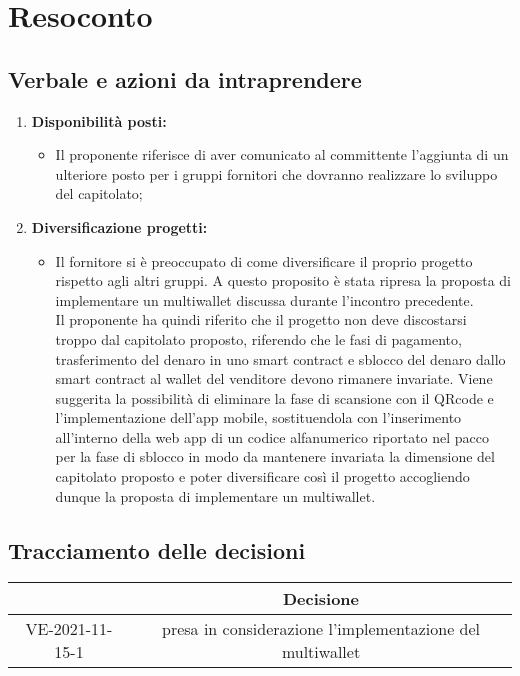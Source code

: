 \section{Resoconto}
\subsection{Verbale e azioni da intraprendere}

\begin{enumerate}
	\item \textbf{Disponibilità posti:}
	\begin{itemize}
		\item Il proponente riferisce di aver comunicato al committente l'aggiunta di un ulteriore posto per i gruppi fornitori che dovranno realizzare lo sviluppo del capitolato;
	\end{itemize}

	\item \textbf{Diversificazione progetti:}
	\begin{itemize}
		\item Il fornitore si è preoccupato di come diversificare il proprio progetto rispetto agli altri gruppi.
		A questo proposito è stata ripresa la proposta di implementare un multiwallet discussa durante l'incontro precedente.\\
		Il proponente ha quindi riferito che il progetto non deve discostarsi troppo dal capitolato proposto, riferendo che le fasi di pagamento, trasferimento del denaro in uno smart contract\glo{} e sblocco del denaro dallo smart contract\glo{} al wallet\glo{} del venditore devono rimanere invariate.
		Viene suggerita la possibilità di eliminare la fase di scansione con il QRcode e l'implementazione dell'app mobile,
		sostituendola con l'inserimento all'interno della web app\glo{} di un codice alfanumerico riportato nel pacco per la fase di sblocco
		in modo da mantenere invariata la dimensione del capitolato proposto e poter diversificare così il progetto
		accogliendo dunque la proposta di implementare un multiwallet.
	\end{itemize}

	

\end{enumerate}

\pagebreak

\subsection{Tracciamento delle decisioni}

\begin{table}[H]
	\centering
	\renewcommand{\arraystretch}{1.8}
	\begin{tabular}{c | c}
		\rowcolor[HTML]{125e28}
		\multicolumn{1}{c}{\color[HTML]{FFFFFF} \textbf{ID}} &
		\multicolumn{1}{c}{\color[HTML]{FFFFFF} \textbf{Decisione}} \\
		\hline
		VE-2021-11-15-1 & presa in considerazione l'implementazione del multiwallet\\ \hline

	\end{tabular}
\end{table}